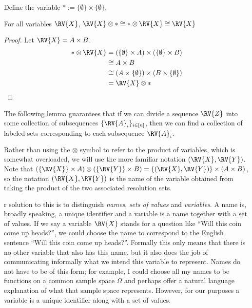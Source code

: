 



Define the variable $*:=\{\emptyset\}\times\{\emptyset\}$.

\begin{lemma}\label{lem:se_id}
For all variables $\RV{X}$, $\RV{X}\otimes * \cong *\otimes \RV{X} \cong \RV{X}$
\end{lemma}

\begin{proof}
Let $\RV{X}=A\times B$.
\begin{align}
    *\otimes \RV{X} &= (\{\emptyset\}\times A)\times(\{\emptyset\}\times B)\\
                    &\cong A\times B\\
                    &\cong (A\times \{\emptyset\})\times(B\times \{\emptyset\})\\
                    &= \RV{X}\otimes *
\end{align}
\end{proof}

The following lemma guarantees that if we can divide a sequence $\RV{Z}$ into some collection of subsequences $\{\RV{A}_i\}_{i\in [n]}$, then we can find a collection of labeled sets corresponding to each subsequence $\RV{A}_i$.

Rather than using the $\otimes$ symbol to refer to the product of variables, which is somewhat overloaded, we will use the more familiar notation $(\RV{X},\RV{Y})$. Note that $(\{\RV{X}\}\times A)\otimes (\{\RV{Y}\}\times B) = \{(\RV{X},\RV{Y})\}\times (A\times B)$, so the notation $(\RV{X},\RV{Y})$ is the name of the variable obtained from taking the product of the two associated resolution sets.

r solution to this is to distinguish \emph{names}, \emph{sets of values} and \emph{variables}. A name is, broadly speaking, a unique identifier and a variable is a name together with a set of values. If we say a variable $\RV{X}$ stands for a question like ``Will this coin come up heads?'', we could choose the name to correspond to the English sentence ``Will this coin come up heads?''. Formally this only means that there is no other variable that also has this name, but it also does the job of communicating informally what we intend this variable to represent. Names do not have to be of this form; for example, I could choose all my names to be functions on a common sample space $\Omega$ and perhaps offer a natural language explanation of what that sample space represents. However, for our purposes a variable is a unique identifier along with a set of values.

